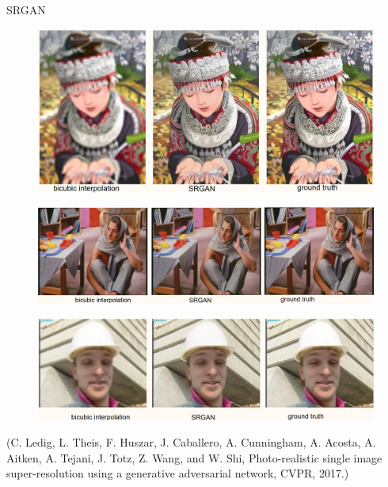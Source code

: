 \begin{frame}[allowframebreaks]

\begin{myexampleblock}{8.8}{SRGAN}
    \begin{figure}[H]
        \centering
        \includegraphics[width=1.0\textwidth]{.././assets/8.7.png}
    \end{figure}

    \begin{figure}[H]
        \centering
        \includegraphics[width=1.0\textwidth]{.././assets/8.8.png}
    \end{figure}

    \begin{figure}[H]
        \centering
        \includegraphics[width=1.0\textwidth]{.././assets/8.9.png}
    \end{figure}

    (C. Ledig, L. Theis, F. Huszar, J. Caballero, A. Cunningham, A. Acosta, A. Aitken, A. Tejani, J. Totz, Z. Wang, and W. Shi, Photo-realistic single image super-resolution using a generative adversarial network, CVPR, 2017.)
\end{myexampleblock}

\end{frame}

